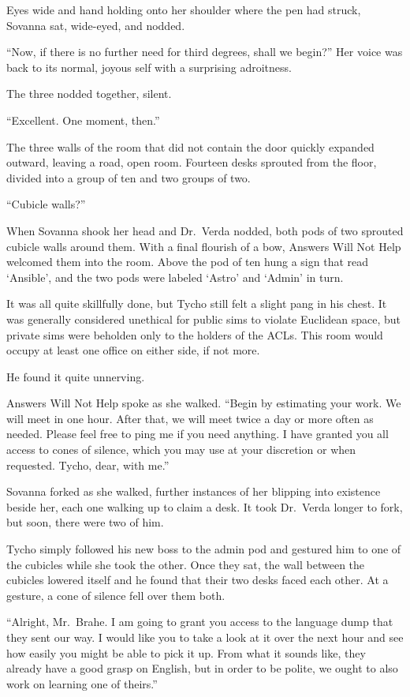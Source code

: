 Eyes wide and hand holding onto her shoulder where the pen had struck, Sovanna sat, wide-eyed, and nodded.

``Now, if there is no further need for third degrees, shall we begin?'' Her voice was back to its normal, joyous self with a surprising adroitness.

The three nodded together, silent.

``Excellent. One moment, then.''

The three walls of the room that did not contain the door quickly expanded outward, leaving a road, open room. Fourteen desks sprouted from the floor, divided into a group of ten and two groups of two.

``Cubicle walls?''

When Sovanna shook her head and Dr.~Verda nodded, both pods of two sprouted cubicle walls around them. With a final flourish of a bow, Answers Will Not Help welcomed them into the room. Above the pod of ten hung a sign that read `Ansible', and the two pods were labeled `Astro' and `Admin' in turn.

It was all quite skillfully done, but Tycho still felt a slight pang in his chest. It was generally considered unethical for public sims to violate Euclidean space, but private sims were beholden only to the holders of the ACLs. This room would occupy at least one office on either side, if not more.

He found it quite unnerving.

Answers Will Not Help spoke as she walked. ``Begin by estimating your work. We will meet in one hour. After that, we will meet twice a day or more often as needed. Please feel free to ping me if you need anything. I have granted you all access to cones of silence, which you may use at your discretion or when requested. Tycho, dear, with me.''

Sovanna forked as she walked, further instances of her blipping into existence beside her, each one walking up to claim a desk. It took Dr.~Verda longer to fork, but soon, there were two of him.

Tycho simply followed his new boss to the admin pod and gestured him to one of the cubicles while she took the other. Once they sat, the wall between the cubicles lowered itself and he found that their two desks faced each other. At a gesture, a cone of silence fell over them both.

``Alright, Mr.~Brahe. I am going to grant you access to the language dump that they sent our way. I would like you to take a look at it over the next hour and see how easily you might be able to pick it up. From what it sounds like, they already have a good grasp on English, but in order to be polite, we ought to also work on learning one of theirs.''


